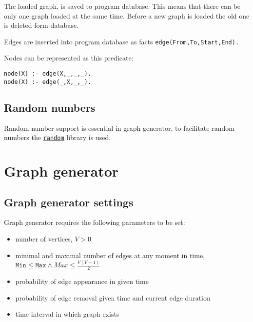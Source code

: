 \documentclass[11pt, a4paper,draft]{article}
\newcommand{\pl}[1]{\texttt{#1}} %
\theoremstyle{plain}
\theoremstyle{definition}
\theoremstyle{remark}
\begin{document}
The loaded graph, is saved to program database. This means that there can be only one
graph loaded at the same time. Before a new graph is loaded the old one is deleted
form database.

Edges are inserted into program database as facts \pl{edge(From,To,Start,End).}

Nodes can be represented as this predicate:
\begin{verbatim}
node(X) :- edge(X,_,_,_).
node(X) :- edge(_,X,_,_).
\end{verbatim}
 
\subsection{Random numbers}
\label{sec:computing-random}

Random number support is essential in graph generator, to facilitate random
numbers the \href{https://www.fi.muni.cz/~hanka/sicstus/doc/html/sicstus/lib_002drandom.html#lib_002drandom}{\pl{random}}
library is used.

\iffalse
\begin{itemize}
    \item \pl{random} library
    \item \pl{use\_module( library( random ) ).}
    \item \href{https://www.fi.muni.cz/~hanka/sicstus/doc/html/sicstus/lib_002drandom.html#lib_002drandom}{\texttt{https://www.fi.muni.cz/$\sim$hanka/sicstus/doc/html/sicstus/\\lib\_002drandom.html\#lib\_002drandom}}
\end{itemize}
\fi

\section{Graph generator}
\label{sec:generator}

\subsection{Graph generator settings}
\label{sec:generator-settings}

Graph generator requires the following parameters to be set:
\begin{itemize}
    \item number of vertices, $V > 0$
    \item minimal and maximal number of edges at any moment in time, 
        $\pl{Min} \le \pl{Max} \land Max \le \frac{ V(V-1)}{2}$
    \item probability of edge appearance in given time
    \item probability of edge removal given time and current edge duration
    \item time interval in which graph exists
\end{itemize}
\end{document}
